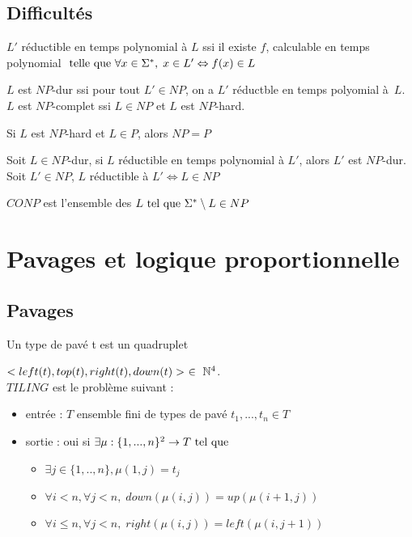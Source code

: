 \documentclass[10pt,a4paper]{article}
\begin{document}
 \subsection{Difficultés}
 \begin{definition}{}$L'$ réductible en temps polynomial à $L$ ssi il existe $f$, calculable en temps polynomial $\tq[le] \forall x \in \Sigma ^*, \; x \in L' \Leftrightarrow f(x) \in L$
 \end{definition}
 \begin{definition}{}$L$ est $NP$-dur ssi pour tout $L' \in NP$, on a $L'$ réductble en temps polyomial à~$L$.\\
 $L$ est $NP$-complet ssi $L \in NP$ et $L$ est $NP$-hard.
 \end{definition}
\begin{rem} 
Si $L$ est $NP$-hard et  $L \in P$, alors $NP = P$
\end{rem}
 
\begin{prop}
 Soit $L \in NP$-dur, si $L$ réductible en temps polynomial à $L'$, alors $L'$ est $NP$-dur.\\
Soit $L' \in NP$, $L$ réductible à $L' \Leftrightarrow L \in NP$
\end{prop}
 
 \begin{definition}$CONP$ est l'ensemble des $L \tq \Sigma^* \setminus L \in NP$
 \end{definition}
 \section{Pavages et logique proportionnelle}
 
 \subsection{Pavages} 
\begin{definition}
Un type de pavé t est un quadruplet 

$< left(t), top(t), right(t), down(t) >~ \in~ \Ns^4$.\\
 $TILING$ est le problème suivant : \begin{itemize}
 \item entrée : $T$ ensemble fini de types de pavé $t_1, ..., t_n \in T$
\item sortie : oui si $\exists \mu : \{ 1, ..., n\} ^2 \rightarrow T \tq$ 
\begin{itemize}
\item $\exists j \in \{1, .., n\}, \mu(1,j) = t_j$
\item $\forall i < n, \forall j < n, \; down(\mu(i,j)) = up(\mu(i+1, j))$
\item $\forall i \leq n , \forall j < n, \; right (\mu (i,j)) = left( \mu (i, j+1))$
\end{itemize}
\end{itemize}
\end{definition}
\end{document}
